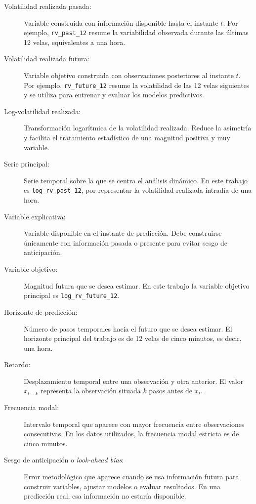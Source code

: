 \begin{description}
    \item[Volatilidad realizada pasada:] Variable construida con información disponible hasta el instante \(t\). Por ejemplo, \texttt{rv\_past\_12} resume la variabilidad observada durante las últimas 12 velas, equivalentes a una hora.

    \item[Volatilidad realizada futura:] Variable objetivo construida con observaciones posteriores al instante \(t\). Por ejemplo, \texttt{rv\_future\_12} resume la volatilidad de las 12 velas siguientes y se utiliza para entrenar y evaluar los modelos predictivos.

    \item[Log-volatilidad realizada:] Transformación logarítmica de la volatilidad realizada. Reduce la asimetría y facilita el tratamiento estadístico de una magnitud positiva y muy variable.

    \item[Serie principal:] Serie temporal sobre la que se centra el análisis dinámico. En este trabajo es \texttt{log\_rv\_past\_12}, por representar la volatilidad realizada intradía de una hora.

    \item[Variable explicativa:] Variable disponible en el instante de predicción. Debe construirse únicamente con información pasada o presente para evitar sesgo de anticipación.

    \item[Variable objetivo:] Magnitud futura que se desea estimar. En este trabajo la variable objetivo principal es \texttt{log\_rv\_future\_12}.

    \item[Horizonte de predicción:] Número de pasos temporales hacia el futuro que se desea estimar. El horizonte principal del trabajo es de 12 velas de cinco minutos, es decir, una hora.

    \item[Retardo:] Desplazamiento temporal entre una observación y otra anterior. El valor \(x_{t-k}\) representa la observación situada \(k\) pasos antes de \(x_t\).

    \item[Frecuencia modal:] Intervalo temporal que aparece con mayor frecuencia entre observaciones consecutivas. En los datos utilizados, la frecuencia modal estricta es de cinco minutos.

    \item[Sesgo de anticipación o \textit{look-ahead bias}:] Error metodológico que aparece cuando se usa información futura para construir variables, ajustar modelos o evaluar resultados. En una predicción real, esa información no estaría disponible.


\end{description}
